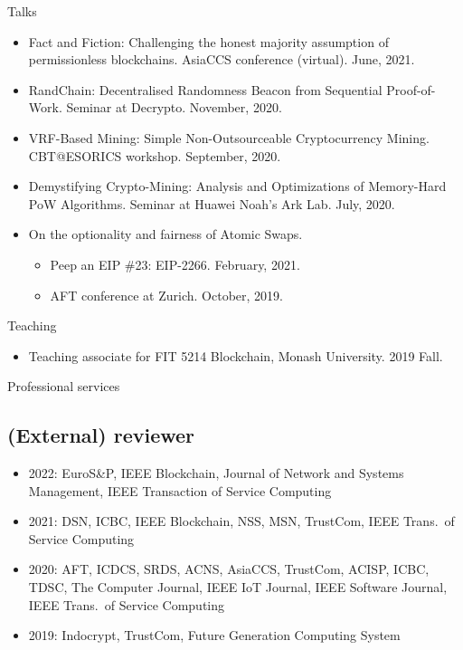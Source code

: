 \documentclass{resume} %
\begin{document}
\begin{rSection}{Talks}
    \begin{itemize}
        \item Fact and Fiction: Challenging the honest majority assumption of permissionless blockchains. AsiaCCS conference (virtual). June, 2021.
        \item RandChain: Decentralised Randomness Beacon from Sequential Proof-of-Work. Seminar at Decrypto. November, 2020.
        \item VRF-Based Mining: Simple Non-Outsourceable Cryptocurrency Mining. CBT@ESORICS workshop. September, 2020.
        \item Demystifying Crypto-Mining: Analysis and Optimizations of Memory-Hard PoW Algorithms. Seminar at Huawei Noah's Ark Lab. July, 2020.
        \item On the optionality and fairness of Atomic Swaps.
              \begin{itemize}
                  \item Peep an EIP \#23: EIP-2266. February, 2021.
                  \item AFT conference at Zurich. October, 2019.
              \end{itemize}
    \end{itemize}
\end{rSection}


\begin{rSection}{Teaching}
    \begin{itemize}
        \item Teaching associate for FIT 5214 Blockchain, Monash University. 2019 Fall.
    \end{itemize}
\end{rSection}


\begin{rSection}{Professional services}
    \subsection*{(External) reviewer}
    \begin{itemize}
        \item 2022: EuroS\&P, IEEE Blockchain, Journal of Network and Systems Management, IEEE Transaction of Service Computing
        \item 2021: DSN, ICBC, IEEE Blockchain, NSS, MSN, TrustCom, IEEE Trans.\ of Service Computing
        \item 2020: AFT, ICDCS, SRDS, ACNS, AsiaCCS, TrustCom, ACISP, ICBC, TDSC, The Computer Journal, IEEE IoT Journal, IEEE Software Journal, IEEE Trans.\ of Service Computing
        \item 2019: Indocrypt, TrustCom, Future Generation Computing System
    \end{itemize}
\end{rSection}
\end{document}
